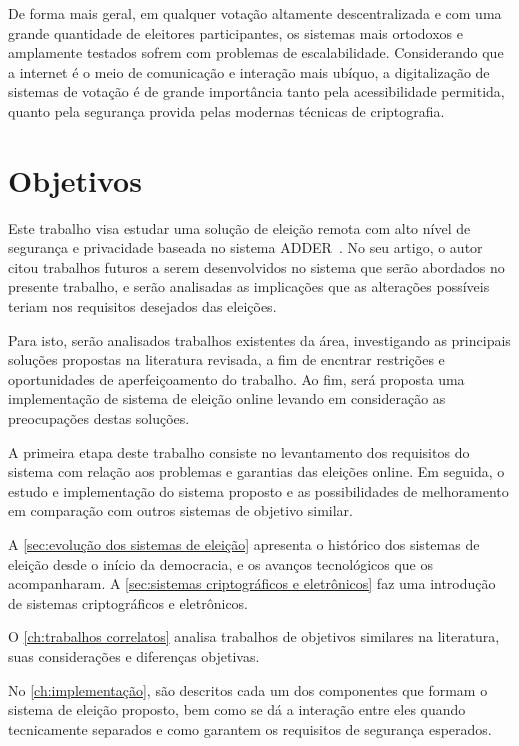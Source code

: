 De forma mais geral, em qualquer votação altamente descentralizada e com uma
grande quantidade de eleitores participantes, os sistemas mais ortodoxos e
amplamente testados sofrem com problemas de escalabilidade. Considerando que a
internet é o meio de comunicação e interação mais ubíquo, a digitalização de
sistemas de votação é de grande importância tanto pela acessibilidade
permitida, quanto pela segurança provida pelas modernas técnicas de
criptografia.

\section{Objetivos}

Este trabalho visa estudar uma solução de eleição remota com alto nível de
segurança e privacidade baseada no sistema ADDER~\cite{kiayias2006internet}. No
seu artigo, o autor citou trabalhos futuros a serem desenvolvidos no sistema
que serão abordados no presente trabalho, e serão analisadas as implicações que
as alterações possíveis teriam nos requisitos desejados das eleições.

Para isto, serão analisados trabalhos existentes da área, investigando as
principais soluções propostas na literatura revisada, a fim de encntrar
restrições e oportunidades de aperfeiçoamento do trabalho. Ao fim, será
proposta uma implementação de sistema de eleição online levando em consideração
as preocupações destas soluções.

A primeira etapa deste trabalho consiste no levantamento dos requisitos do
sistema com relação aos problemas e garantias das eleições online. Em seguida,
o estudo e implementação do sistema proposto e as possibilidades de
melhoramento em comparação com outros sistemas de objetivo similar.

A \autoref{sec:evolução dos sistemas de eleição} apresenta o histórico dos
sistemas de eleição desde o início da democracia, e os avanços tecnológicos que
os acompanharam. A \autoref{sec:sistemas criptográficos e eletrônicos} faz uma
introdução de sistemas criptográficos e eletrônicos.

O \autoref{ch:trabalhos correlatos} analisa trabalhos de objetivos similares na
literatura, suas considerações e diferenças objetivas.

No \autoref{ch:implementação}, são descritos cada um dos componentes que formam
o sistema de eleição proposto, bem como se dá a interação entre eles quando
tecnicamente separados e como garantem os requisitos de segurança esperados.
